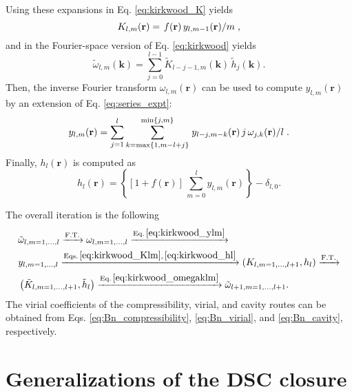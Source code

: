 \documentclass[aip,jcp,preprint,superscriptaddress,showpacs,preprintnumbers,amsmath,amssymb]{revtex4-1}
\numberwithin{equation}{section}
\newcommand{\vct}[1]{\mathbf{#1}}
\providecommand{\vr}{} %
\renewcommand{\vr}{\vct{r}}
\newcommand{\vk}{\vct{k}}
\begin{document}
Using these expansions in Eq. \eqref{eq:kirkwood_K} yields
%
\begin{equation}
K_{l,m}(\vr)
=
\left.
  f(\vr) \, y_{l,m-1}(\vr)
\middle/
  m
\right.,
\label{eq:kirkwood_Klm}
\end{equation}
%
and in the Fourier-space version of
Eq. \eqref{eq:kirkwood} yields
%
\begin{equation}
\tilde \omega_{l,m}(\vk)
=
\sum_{j = 0}^{l - 1}
\tilde K_{l - j - 1, m}(\vk) \,
\tilde h_j(\vk).
\label{eq:kirkwood_omegaklm}
\end{equation}
%
Then,
the inverse Fourier transform $\omega_{l,m}(\vr)$
can be used to compute $y_{l,m}(\vr)$
by an extension of Eq. \eqref{eq:series_expt}:
%
%
%
\begin{equation}
y_{l,m}(\vr)
=
\sum_{ j = 1 }^l
\sum_{ k = \max\{1, m - l + j\} }^{ \min\{j, m\} }
\left.
  y_{l-j, m-k}(\vr) \, j \, \omega_{j, k}(\vr)
\middle/
  l
\right..
\label{eq:kirkwood_ylm}
\end{equation}
%
%
%
Finally, $h_l(\vr)$ is computed as
%
%
%
\begin{equation}
h_l(\vr)
=
\left\{
  [1 + f(\vr)] \,
  \sum_{m = 0}^l y_{l,m}(\vr)
\right\}
- \delta_{l,0}.
\label{eq:kirkwood_hl}
\end{equation}



The overall iteration is the following
%
%
%
\begin{align*}
&
\tilde\omega_{l, m = 1, \dots, l}
\xrightarrow{ \mathrm{F.T.} }
\omega_{l, m = 1, \dots, l}
\xrightarrow{ \mathrm{Eq.\,\eqref{eq:kirkwood_ylm}} }
\\
&
y_{l, m = 1, \dots, l}
\xrightarrow{ \mathrm{Eqs.\,\eqref{eq:kirkwood_Klm},\,
                            \eqref{eq:kirkwood_hl} } }
\left(
K_{l, m = 1, \dots, l+1}, h_l
\right)
\xrightarrow{ \mathrm{F.T.} }
\\
&
\left(
\tilde K_{l, m = 1, \dots, l+1}, \tilde h_l
\right)
\xrightarrow{ \mathrm{Eq.\,\eqref{eq:kirkwood_omegaklm}} }
\tilde \omega_{l+1, m = 1, \dots, l+1}.
\end{align*}
%
%
%
The virial coefficients of
the compressibility, virial, and cavity routes
can be obtained from Eqs.
\eqref{eq:Bn_compressibility},
\eqref{eq:Bn_virial},
and
\eqref{eq:Bn_cavity},
respectively.





\section{\label{sec:extension}
Generalizations of the DSC closure}
\end{document}

